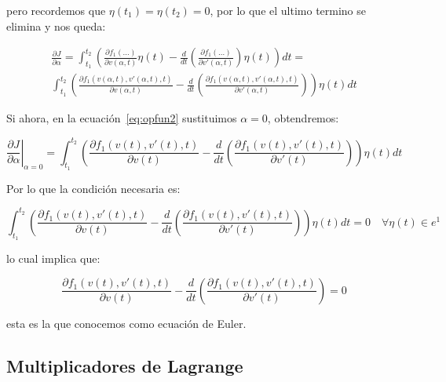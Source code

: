             pero recordemos que $\eta(t_1) = \eta(t_2) = 0$, por lo que el ultimo termino se elimina y nos queda:

            \begin{multline} \label{eq:opfun2}
                \frac{\partial J}{\partial \alpha} = \int_{t_1}^{t_2}\left( \frac{\partial f_1(\dots)}{\partial v(\alpha, t)} \eta(t) - \frac{d}{dt} \left( \frac{\partial f_1(\dots)}{\partial v'(\alpha, t)} \right) \eta(t) \right) dt = \\
                \int_{t_1}^{t_2}\left( \frac{\partial f_1(v(\alpha, t), v'(\alpha, t), t)}{\partial v(\alpha, t)} - \frac{d}{dt} \left( \frac{\partial f_1(v(\alpha, t), v'(\alpha, t), t)}{\partial v'(\alpha, t)} \right) \right) \eta(t) dt
            \end{multline}

            Si ahora, en la ecuación~\ref{eq:opfun2} sustituimos $\alpha = 0$, obtendremos:

            \begin{equation*}
                \left. \frac{\partial J}{\partial \alpha} \right|_{\alpha=0} = \int_{t_1}^{t_2}\left( \frac{\partial f_1(v(t), v'(t), t)}{\partial v(t)} - \frac{d}{dt} \left( \frac{\partial f_1(v(t), v'(t), t)}{\partial v'(t)} \right) \right) \eta(t) dt
            \end{equation*}

            Por lo que la condición necesaria es:

            \begin{equation*}
                \int_{t_1}^{t_2}\left( \frac{\partial f_1(v(t), v'(t), t)}{\partial v(t)} - \frac{d}{dt} \left( \frac{\partial f_1(v(t), v'(t), t)}{\partial v'(t)} \right) \right) \eta(t) dt = 0 \quad \forall \eta(t) \in e^1
            \end{equation*}

            lo cual implica que:

            \begin{equation}
                \frac{\partial f_1(v(t), v'(t), t)}{\partial v(t)} - \frac{d}{dt} \left( \frac{\partial f_1(v(t), v'(t), t)}{\partial v'(t)} \right)  = 0
            \end{equation}

            esta es la que conocemos como ecuación de Euler.

        \subsection{Multiplicadores de Lagrange}

